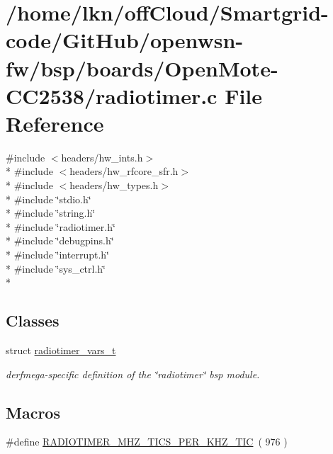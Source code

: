 \hypertarget{_open_mote-_c_c2538_2radiotimer_8c}{}\section{/home/lkn/off\+Cloud/\+Smartgrid-\/code/\+Git\+Hub/openwsn-\/fw/bsp/boards/\+Open\+Mote-\/\+C\+C2538/radiotimer.c File Reference}
\label{_open_mote-_c_c2538_2radiotimer_8c}
{\ttfamily \#include $<$headers/hw\+\_\+ints.\+h$>$}\\*
{\ttfamily \#include $<$headers/hw\+\_\+rfcore\+\_\+sfr.\+h$>$}\\*
{\ttfamily \#include $<$headers/hw\+\_\+types.\+h$>$}\\*
{\ttfamily \#include \char`\"{}stdio.\+h\char`\"{}}\\*
{\ttfamily \#include \char`\"{}string.\+h\char`\"{}}\\*
{\ttfamily \#include \char`\"{}radiotimer.\+h\char`\"{}}\\*
{\ttfamily \#include \char`\"{}debugpins.\+h\char`\"{}}\\*
{\ttfamily \#include \char`\"{}interrupt.\+h\char`\"{}}\\*
{\ttfamily \#include \char`\"{}sys\+\_\+ctrl.\+h\char`\"{}}\\*
\subsection*{Classes}
\begin{DoxyCompactItemize}
\item 
struct \hyperlink{structradiotimer__vars__t}{radiotimer\+\_\+vars\+\_\+t}
\begin{DoxyCompactList}\small\item\em derfmega-\/specific definition of the \char`\"{}radiotimer\char`\"{} bsp module. \end{DoxyCompactList}\end{DoxyCompactItemize}
\subsection*{Macros}
\begin{DoxyCompactItemize}
\item 
\#define \hyperlink{_open_mote-_c_c2538_2radiotimer_8c_a6cc5841a6d036e3bfc3cc73261dfa004}{R\+A\+D\+I\+O\+T\+I\+M\+E\+R\+\_\+M\+H\+Z\+\_\+\+T\+I\+C\+S\+\_\+\+P\+E\+R\+\_\+K\+H\+Z\+\_\+\+T\+IC}~( 976 )
\end{DoxyCompactItemize}
